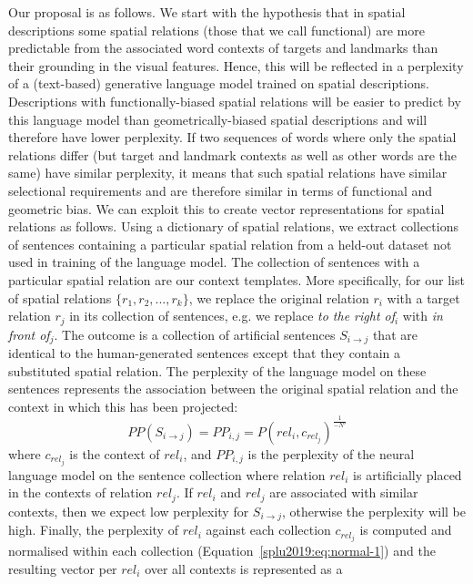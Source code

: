Our proposal is as follows. We start with the hypothesis that in spatial
descriptions some spatial relations (those that we call functional) are more
predictable from the associated word contexts of targets and landmarks than
their grounding in the visual features. Hence, this will be reflected in a
perplexity of a (text-based) generative language model trained on spatial
descriptions. Descriptions with functionally-biased spatial relations will be
easier to predict by this language model than geometrically-biased spatial
descriptions and will therefore have lower perplexity. If two sequences of
words where only the spatial relations differ (but target and landmark contexts
as well as other words are the same) have similar perplexity, it means that
such spatial relations have similar selectional requirements and are therefore
similar in terms of functional and geometric bias. We can exploit this to
create vector representations for spatial relations as follows.
Using a dictionary of spatial relations, we extract collections of sentences
containing a particular spatial relation from a held-out dataset not used in
training of the language model.
The collection of sentences with a particular spatial relation are our context
templates.
More specifically, for our list of spatial relations $\{r_1, r_2, ..., r_k\}$,
we %
replace the original relation $r_i$ with a target relation $r_j$ in its
collection of sentences, e.g. we replace \emph{to the right of}$_i$ with
\emph{in front of}$_j$. The outcome is a collection of artificial sentences
$S_{i \to j}$
that are identical to the human-generated sentences except that they contain a substituted
spatial relation. The perplexity of the language model on these sentences
represents the association between the original spatial relation and the
context in which this has been projected:
\begin{equation}\label{splu2019:eq:swapped}
PP(S_{i \to j}) = PP_{i, j} = P(rel_i, c_{rel_j})^{\frac{1}{-N'}}
\end{equation}
\noindent where $c_{rel_j}$ is the context of $rel_i$, and $PP_{i, j}$ is the
perplexity of the neural language model on the sentence collection where
relation $rel_i$ is artificially placed in the contexts of relation $rel_j$. If
$rel_i$ and $rel_j$ are associated with similar contexts, then we expect
low perplexity for $S_{i \to j}$, otherwise the perplexity will be high.
Finally, the perplexity of $rel_i$ against each collection $c_{rel_j}$ is
computed and normalised within each collection (Equation~\ref{splu2019:eq:normal-1}) and
the resulting vector per $rel_i$ over all contexts is represented as a
